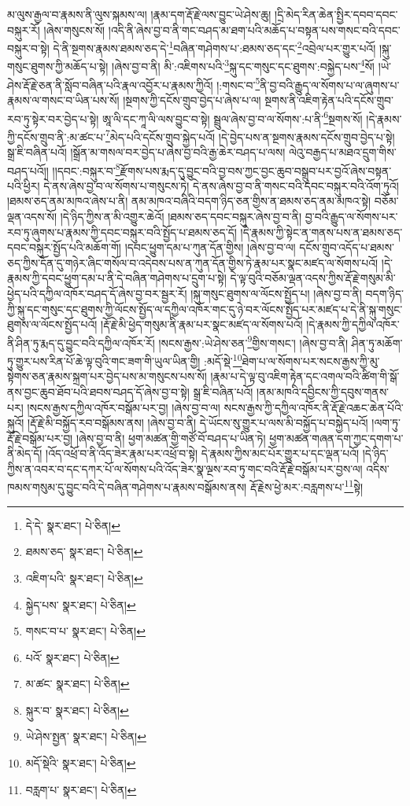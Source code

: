 མ་ལུས་རྒྱལ་བ་རྣམས་ནི་ལུས་སྐམས་ལ། །རྣམ་དག་རྡོ་རྗེ་ལས་བྱུང་ཡེ་ཤེས་ཆུ། །དྲི་མེད་རིན་ཆེན་སྤྱིར་དབབ་དབང་བསྐུར་རོ། །ཞེས་གསུངས་སོ། །འདི་ནི་ཞེས་བྱ་བ་ནི་གང་བཤད་མ་ཐག་པའི་མཆོད་པ་བསྟན་པས་གསང་བའི་དབང་བསྐུར་བ་སྟེ། དེ་ནི་སྔགས་རྣམས་ཐམས་ཅད་དེ་\footnote{དེ་དེ་  སྣར་ཐང་།  པེ་ཅིན། }བཞིན་གཤེགས་པ་:ཐམས་ཅད་དང་\footnote{ཐམས་ཅད་  སྣར་ཐང་།  པེ་ཅིན། }འབྲེལ་པར་གྱུར་པའོ། །སྐུ་གསུང་ཐུགས་ཀྱི་མཆོད་པ་སྟེ། །ཞེས་བྱ་བ་ནི། མི་:འཇིགས་པའི་\footnote{འཇིག་པའི་  སྣར་ཐང་།  པེ་ཅིན། }སྐུ་དང་གསུང་དང་ཐུགས་:བསྐྱེད་པས་\footnote{སྐྱེད་པས་  སྣར་ཐང་།  པེ་ཅིན། }སོ། །ཡེ་ཤེས་རྡོ་རྗེ་ཅན་ནི་སློབ་བཞིན་པའི་རྣལ་འབྱོར་པ་རྣམས་ཀྱིའོ། །:གསང་བ་\footnote{གསང་བ་པ་  སྣར་ཐང་།  པེ་ཅིན། }ནི་བྱ་བའི་རྒྱུད་ལ་སོགས་པ་ལ་ཞུགས་པ་རྣམས་ལ་གསང་བ་ཡིན་པས་སོ། །སྔགས་ཀྱི་དངོས་གྲུབ་བྱེད་པ་ཞེས་པ་ལ། སྔགས་ནི་འཇིག་རྟེན་པའི་དངོས་གྲུབ་རབ་ཏུ་སྟེར་བར་བྱེད་པ་སྟེ། ཨཱ་ལི་དང་ཀཱ་ལི་ལས་བྱུང་བ་སྟེ། སྦྲུལ་ཞེས་བྱ་བ་ལ་སོགས་:པ་ནི་\footnote{པའོ་  སྣར་ཐང་།  པེ་ཅིན། }སྔགས་སོ། །དེ་རྣམས་ཀྱི་དངོས་གྲུབ་ནི་:མ་ཚང་པ་\footnote{མ་ཚང་  སྣར་ཐང་།  པེ་ཅིན། }མེད་པའི་དངོས་གྲུབ་སྐྱེད་པའོ། །དེ་བྱེད་པས་ན་སྔགས་རྣམས་དངོས་གྲུབ་བྱེད་པ་སྟེ། སྒྲ་ཇི་བཞིན་པའོ། །སྒྲོན་མ་གསལ་བར་བྱེད་པ་ཞེས་བྱ་བའི་རྒྱ་ཆེར་བཤད་པ་ལས། ལེའུ་བརྒྱད་པ་མཐའ་དྲུག་གིས་བཤད་པའོ།། །།དབང་:བསྐུར་བ་\footnote{སྐུར་བ་  སྣར་ཐང་།  པེ་ཅིན། }རྫོགས་པས་རྨད་དུ་བྱུང་བའི་བྱ་བས་ཀྱང་བྱང་ཆུབ་བསྒྲུབ་པར་བྱའོ་ཞེས་བསྟན་པའི་ཕྱིར། དེ་ནས་ཞེས་བྱ་བ་ལ་སོགས་པ་གསུངས་ཏེ། དེ་ནས་ཞེས་བྱ་བ་ནི་གསང་བའི་དབང་བསྐུར་བའི་འོག་ཏུའོ། །ཐམས་ཅད་ནམ་མཁའ་ཞེས་པ་ནི། ནམ་མཁའ་བཞིའི་བདག་ཉིད་ཅན་གྱིས་ན་ཐམས་ཅད་ནམ་མཁའ་སྟེ། བཅོམ་ལྡན་འདས་སོ། །དེ་ཉིད་ཀྱིས་ན་མི་འགྱུར་ཆེའོ། །ཐམས་ཅད་དབང་བསྐུར་ཞེས་བྱ་བ་ནི། བྱ་བའི་རྒྱུད་ལ་སོགས་པར་རབ་ཏུ་ཞུགས་པ་རྣམས་ཀྱི་དབང་བསྐུར་བའི་སྤྱོད་པ་ཐམས་ཅད་དོ། །དེ་རྣམས་ཀྱི་སྟེང་ན་གནས་པས་ན་ཐམས་ཅད་དབང་བསྐུར་སྤྱོད་པའི་མཆོག་གོ། །དབང་ཕྱུག་དམ་པ་ཀུན་དོན་གྱིས། །ཞེས་བྱ་བ་ལ། དངོས་གྲུབ་འདོད་པ་ཐམས་ཅད་ཀྱིས་དོན་དུ་གཉེར་ཞིང་གསོལ་བ་འདེབས་པས་ན་ཀུན་དོན་གྱིས་ཏེ་རྣམ་པར་སྣང་མཛད་ལ་སོགས་པའོ། །དེ་རྣམས་ཀྱི་དབང་ཕྱུག་དམ་པ་ནི་དེ་བཞིན་གཤེགས་པ་དྲུག་པ་སྟེ། དེ་ལྟ་བུའི་བཅོམ་ལྡན་འདས་ཀྱིས་རྡོ་རྗེ་གསུམ་མི་ཕྱེད་པའི་དཀྱིལ་འཁོར་བཤད་དོ་ཞེས་བྱ་བར་སྦྱར་རོ། །སྐུ་གསུང་ཐུགས་ལ་ལོངས་སྤྱོད་པ། །ཞེས་བྱ་བ་ནི། བདག་ཉིད་ཀྱི་སྐུ་དང་གསུང་དང་ཐུགས་ཀྱི་ལོངས་སྤྱོད་ལ་དཀྱིལ་འཁོར་གང་དུ་ཉེ་བར་ལོངས་སྤྱོད་པར་མཛད་པ་དེ་ནི་སྐུ་གསུང་ཐུགས་ལ་ལོངས་སྤྱོད་པའོ། །རྡོ་རྗེ་མི་ཕྱེད་གསུམ་ནི་རྣམ་པར་སྣང་མཛད་ལ་སོགས་པའོ། །དེ་རྣམས་ཀྱི་དཀྱིལ་འཁོར་ནི་ཤིན་ཏུ་རྨད་དུ་བྱུང་བའི་དཀྱིལ་འཁོར་རོ། །སངས་རྒྱས་:ཡེ་ཤེས་ཅན་\footnote{ཡེ་ཤེས་སྤྱན་  སྣར་ཐང་།  པེ་ཅིན། }གྱིས་གསང་། །ཞེས་བྱ་བ་ནི། ཤིན་ཏུ་མཆོག་ཏུ་གྱུར་པས་རིན་པོ་ཆེ་ལྟ་བུའི་གང་ཟག་གི་ཡུལ་ཡིན་གྱི། :མདོ་སྡེ་\footnote{མདོ་སྡེའི་  སྣར་ཐང་།  པེ་ཅིན། }ཐེག་པ་ལ་སོགས་པར་སངས་རྒྱས་ཀྱི་མུ་སྟེགས་ཅན་རྣམས་སྐྲག་པར་བྱེད་པས་མ་གསུངས་པས་སོ། །རྣམ་པ་དེ་ལྟ་བུ་འཇིག་རྟེན་དང་འགལ་བའི་ཚིག་གི་སྒོ་ནས་བྱང་ཆུབ་ཐོབ་པའི་ཐབས་བཤད་དོ་ཞེས་བྱ་བ་སྟེ། སྒྲ་ཇི་བཞིན་པའོ། །ནམ་མཁའི་དབྱིངས་ཀྱི་དབུས་གནས་པར། །སངས་རྒྱས་དཀྱིལ་འཁོར་བསྒོམ་པར་བྱ། །ཞེས་བྱ་བ་ལ། སངས་རྒྱས་ཀྱི་དཀྱིལ་འཁོར་ནི་རྡོ་རྗེ་འཆང་ཆེན་པོའི་སྐུའོ། །རྡོ་རྗེ་མི་བསྐྱོད་རབ་བསྒོམས་ནས། །ཞེས་བྱ་བ་ནི། དེ་ཡོངས་སུ་གྱུར་པ་ལས་མི་བསྐྱོད་པ་བསྐྱེད་པའོ། །ལག་ཏུ་རྡོ་རྗེ་བསྒོམ་པར་བྱ། །ཞེས་བྱ་བ་ནི། ཕྱག་མཚན་གྱི་གཙོ་བོ་བཤད་པ་ཡིན་ཏེ། ཕྱག་མཚན་གཞན་དག་ཀྱང་དགག་པ་ནི་མེད་དོ། །འོད་འཕྲོ་བ་ནི་འོད་ཟེར་རྣམ་པར་འཕྲོ་བ་སྟེ། དེ་རྣམས་ཀྱིས་མང་པོར་གྱུར་པ་དང་ལྡན་པའོ། །དེ་ཉིད་ཀྱིས་ན་འབར་བ་དང་དཀར་པོ་ལ་སོགས་པའི་འོད་ཟེར་སྣ་ལྔས་རབ་ཏུ་གང་བའི་རྡོ་རྗེ་བསྒོམ་པར་བྱས་ལ། འདིས་ཁམས་གསུམ་དུ་བྱུང་བའི་དེ་བཞིན་གཤེགས་པ་རྣམས་བསྒོམས་ནས། རྡོ་རྗེས་ཕྱེ་མར་:བརླགས་པ་\footnote{བརླག་པ་  སྣར་ཐང་།  པེ་ཅིན། }སྟེ། 